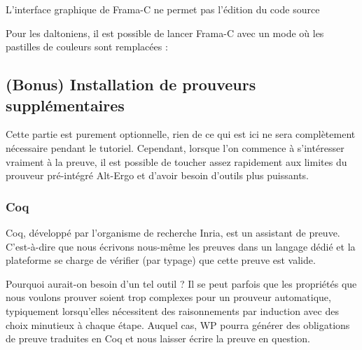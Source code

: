 \documentclass[12pt,francais,]{scrbook}
\newenvironment{Shaded}{}{}
\newcommand{\KeywordTok}[1]{\textcolor[rgb]{0.00,0.44,0.13}{\textbf{{#1}}}}
\newenvironment{zdsalertblock}[1]{%
  \tcolorbox[beamer,%
    noparskip,breakable,
    colback=LightCoral,colframe=DarkRed,%
    colbacklower=Tomato,%
    title=#1]
}{\endtcolorbox}
\newenvironment{zdsblock}[1]{%
  \tcolorbox[beamer,%
    noparskip,breakable,
    colback=LightBlue,colframe=DarkBlue,%
    colbacklower=DarkBlue,%
    title=#1]
}{\endtcolorbox}
\begin{document}
\begin{zdsalertblock}{Attention}
  L'interface graphique de Frama-C ne permet pas l'édition du code source
\end{zdsalertblock}

\begin{zdsblock}{Information}
  Pour les daltoniens, il est possible de lancer Frama-C avec un mode où
  les pastilles de couleurs sont remplacées :
  \begin{footnotesize}\begin{Shaded}
  \end{Shaded}\end{footnotesize}
\end{zdsblock}
  
\subsection{(Bonus) Installation de prouveurs
supplémentaires}\label{bonus-installation-de-prouveurs-suppluxe9mentaires}

Cette partie est purement optionnelle, rien de ce qui est ici ne sera
complètement nécessaire pendant le tutoriel. Cependant, lorsque l'on
commence à s'intéresser vraiment à la preuve, il est possible de
toucher assez rapidement aux limites du prouveur pré-intégré Alt-Ergo et
d'avoir besoin d'outils plus puissants.

\subsubsection{Coq}\label{coq}

Coq, développé par l'organisme de recherche Inria, est un assistant de
preuve. C'est-à-dire que nous écrivons nous-même les preuves dans un
langage dédié et la plateforme se charge de vérifier (par typage) que
cette preuve est valide.

Pourquoi aurait-on besoin d'un tel outil ? Il se peut parfois que les
propriétés que nous voulons prouver soient trop complexes pour un
prouveur automatique, typiquement lorsqu'elles nécessitent des
raisonnements par induction avec des choix minutieux à chaque étape.
Auquel cas, WP pourra générer des obligations de preuve traduites en Coq
et nous laisser écrire la preuve en question.
\end{document}
